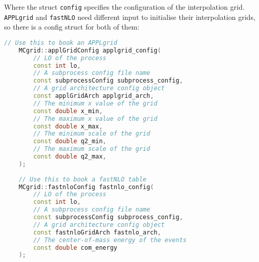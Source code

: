 \documentclass[11pt]{article}
\newcommand{\appl} {{\tt APPLgrid}\xspace}
\newcommand{\fnlo} {{\tt fastNLO}\xspace}
\begin{document}
Where the struct \lstinline[language=c++]{config} specifies the configuration of the interpolation grid. \appl and \fnlo need different input to initialise their interpolation grids, so there is a config struct for both of them:
\begin{lstlisting}[language=c++]
    // Use this to book an APPLgrid
	MCgrid::applGridConfig applgrid_config( 
		// LO of the process
		const int lo,
		// A subprocess config file name
		const subprocessConfig subprocess_config,
		// A grid architecture config object
		const applGridArch applgrid_arch,
		// The minimum x value of the grid
		const double x_min,
		// The maximum x value of the grid
		const double x_max,
		// The minimum scale of the grid
		const double q2_min,
		// The maximum scale of the grid
		const double q2_max,
	);
	
    // Use this to book a fastNLO table
	MCgrid::fastnloConfig fastnlo_config( 
		// LO of the process
		const int lo,      
		// A subprocess config file name
		const subprocessConfig subprocess_config,
		// A grid architecture config object
		const fastnloGridArch fastnlo_arch,
		// The center-of-mass energy of the events
		const double com_energy
	);
\end{lstlisting}
\end{document}
